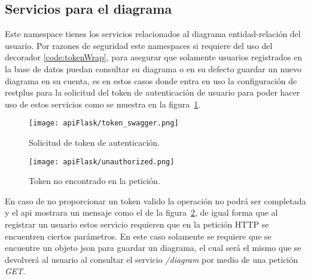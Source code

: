 \subsection{Servicios para el diagrama}

Este namespace tienes los servicios relacionados al diagrama entidad-relación del usuario. Por razones de seguridad este namespaces si requiere del uso del decorador \ref{code:tokenWrap}, para asegurar que solamente usuarios registrados en la base de datos puedan consultar su diagrama o en su defecto guardar un nuevo diagrama en su cuenta, es en estos casos donde entra en uso la configuración de restplus para la solicitud del token de autenticación de usuario para poder hacer uso de estos servicios como se muestra en la figura~\ref{img:tokenSwagger}.

\begin{figure}[H]
  \centering
  \texttt{[image: apiFlask/token\_swagger.png]}
  \caption{Solicitud de token de autenticación.}
  \label{img:tokenSwagger}
\end{figure}

\begin{figure}[H]
  \centering
  \texttt{[image: apiFlask/unauthorized.png]}
  \caption{Token no encontrado en la petición.}
  \label{img:unauthorized}
\end{figure}

En caso de no proporcionar un token valido la operación no podrá ser completada y el api mostrara un mensaje como el de la figura~\ref{img:unauthorized}, de igual forma que al registrar un usuario estos servicio requieren que en la petición HTTP se encuentren ciertos parámetros. En este caso solamente se requiere que se encuentre un objeto json para guardar un diagrama, el cual será el mismo que se devolverá al usuario al consultar el servicio \textit{/diagram} por medio de una petición \textit{GET}.